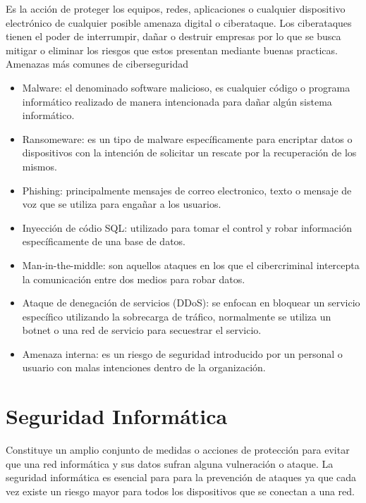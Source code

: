 \documentclass[12pt]{article}
\begin{document}
Es la acción de proteger los equipos, redes, aplicaciones o cualquier dispositivo electrónico de cualquier posible amenaza digital o ciberataque. Los ciberataques tienen el poder de interrumpir, dañar o destruir empresas por lo que se busca mitigar o eliminar los riesgos que estos presentan mediante buenas practicas. 
\\
Amenazas más comunes de ciberseguridad
\begin{itemize}
\item Malware: el denominado software malicioso, es cualquier código o programa informático realizado de manera intencionada para dañar algún sistema informático.
\item Ransomeware: es un tipo de malware específicamente para encriptar datos o dispositivos con la intención de solicitar un rescate por la recuperación de los mismos.
\item Phishing: principalmente mensajes de correo electronico, texto o mensaje de voz que se utiliza para engañar a los usuarios.
\item Inyección de códio SQL: utilizado para tomar el control y robar información específicamente de una base de datos.
\item Man-in-the-middle: son aquellos ataques en los que el cibercriminal intercepta la comunicación entre dos medios para robar datos.
\item Ataque de denegación de servicios (DDoS): se enfocan en bloquear un servicio específico utilizando la sobrecarga de tráfico, normalmente se utiliza un botnet o una red de servicio para secuestrar el servicio.
\item Amenaza interna: es un riesgo de seguridad introducido por un personal o usuario con malas intenciones dentro de la organización.
\end{itemize}


\section*{Seguridad Informática}
Constituye un amplio conjunto de medidas o acciones de protección para evitar que una red informática y sus datos sufran alguna vulneración o ataque. La seguridad informática es esencial para para la prevención de ataques ya que cada vez existe un riesgo mayor para todos los dispositivos que se conectan a una red.\\ 
\end{document}
